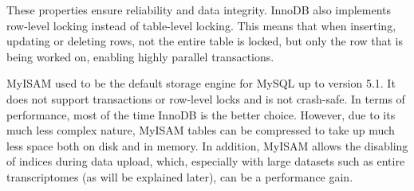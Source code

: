 These properties ensure reliability and data integrity. InnoDB also implements
row-level locking instead of table-level locking. This means that when
inserting, updating or deleting rows, not the entire table is locked, but only
the row that is being worked on, enabling highly parallel transactions. 

MyISAM used to be the default storage engine for MySQL up to version 5.1. It
does not support transactions or row-level locks and is not crash-safe. In terms
of performance, most of the time InnoDB is the better choice. However, due to
its much less complex nature, MyISAM tables can be compressed to take up much
less space both on disk and in memory. In addition, MyISAM allows the disabling
of indices during data upload, which, especially with large datasets such as
entire transcriptomes (as will be explained later), can be a performance gain. 
